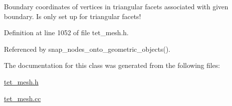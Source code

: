 Boundary coordinates of vertices in triangular facets associated with given boundary. Is only set up for triangular facets! 



Definition at line 1052 of file tet\+\_\+mesh.\+h.



Referenced by snap\+\_\+nodes\+\_\+onto\+\_\+geometric\+\_\+objects().



The documentation for this class was generated from the following files\+:\begin{DoxyCompactItemize}
\item 
\hyperlink{tet__mesh_8h}{tet\+\_\+mesh.\+h}\item 
\hyperlink{tet__mesh_8cc}{tet\+\_\+mesh.\+cc}\end{DoxyCompactItemize}
